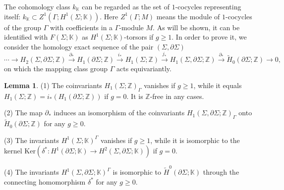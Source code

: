 \documentclass[a4paper,12pt, twoside]{amsart}
\theoremstyle{definition}
\newtheorem{lem}[dfn]{Lemma}
\theoremstyle{remark}
\numberwithin{equation}{section}
\newcommand\bK{{\mathbb{K}}}
\newcommand\bZ{{\mathbb{Z}}}
\newcommand\Ker{\mathrm{Ker}}
\newcommand\pa{\partial}
\begin{document}
The cohomology class $k_\bK$ can be regarded as the set of $1$-cocycles representing itself: $k_\bK \subset Z^1(\Gamma; H^1(\Sigma; \bK))$. 
Here $Z^1(\Gamma; M)$ means the module of $1$-cocycles of the group $\Gamma$ with coefficients in a $\Gamma$-module $M$. 
As will be shown, it can be identified with $F(\Sigma; \bK)$ as $H^1(\Sigma;\bK)$-torsors if $g \geq 1$.
In order to prove it, we consider the homology exact sequence of the pair
$(\Sigma, \pa\Sigma)$
\begin{equation}\label{eq:pair}
\cdots \to H_2(\Sigma, \pa\Sigma; \bZ) \overset{\pa_*}\to 
H_1(\pa\Sigma; \bZ) \overset{i_*}\to 
H_1(\Sigma; \bZ) \overset{j_*}\to 
H_1(\Sigma, \pa\Sigma; \bZ) \overset{\pa_*}\to 
\tilde H_0(\pa\Sigma; \bZ) \to 0,
\end{equation}
on which the mapping class group $\Gamma$ acts equivariantly.
\begin{lem}\label{lem:coinvariants}
{\rm (1)} The coinvariants $H_1(\Sigma; \bZ)_\Gamma$ vanishes if $g \geq 1$, while it equals $H_1(\Sigma; \bZ) = i_*(H_1(\pa\Sigma; \bZ))$ if $g =0$.
It is $\bZ$-free in any cases. \par
{\rm (2)} The map $\pa_*$ induces an isomorphism of 
the coinvariants $H_1(\Sigma, \pa\Sigma; \bZ)_\Gamma$
 onto $\tilde H_0(\pa\Sigma; \bZ)$ for any $g \geq 0$.\par
 {\rm (3)} The invariants $H^1(\Sigma; \bK)^\Gamma$ vanishes if $g \geq 1$, while it is isomorphic to the kernel $\Ker(\delta^*: H^1(\pa\Sigma; \bK) \to H^2(\Sigma, \pa\Sigma; \bK))$ 
 if $g =0$.\par
 {\rm (4)} The invariants $H^1(\Sigma, \pa\Sigma; \bK)^\Gamma$ is isomorphic to $\tilde H^0(\pa\Sigma; \bK)$ 
 through the connecting homomorphism $\delta^*$ for any $g \geq 0$. 
\end{lem}
\end{document}
